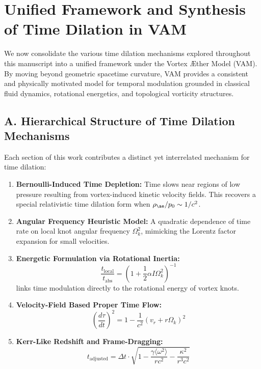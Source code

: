 \section{Unified Framework and Synthesis of Time Dilation in VAM}

We now consolidate the various time dilation mechanisms explored throughout this manuscript into a unified framework under the Vortex Æther Model (VAM). By moving beyond geometric spacetime curvature, VAM provides a consistent and physically motivated model for temporal modulation grounded in classical fluid dynamics, rotational energetics, and topological vorticity structures.

\subsection*{A. Hierarchical Structure of Time Dilation Mechanisms}

Each section of this work contributes a distinct yet interrelated mechanism for time dilation:

\begin{enumerate}
    \item \textbf{Bernoulli-Induced Time Depletion:} Time slows near regions of low pressure resulting from vortex-induced kinetic velocity fields. This recovers a special relativistic time dilation form when \( \rho_{\ae} / p_0 \sim 1/c^2 \).

    \item \textbf{Angular Frequency Heuristic Model:} A quadratic dependence of time rate on local knot angular frequency \( \Omega_k^2 \), mimicking the Lorentz factor expansion for small velocities.

    \item \textbf{Energetic Formulation via Rotational Inertia:}
    \[
        \boxed{\frac{t_{\text{local}}}{t_{\text{abs}}} = \left(1 + \frac{1}{2} \alpha I \Omega_k^2 \right)^{-1}}
    \]
    links time modulation directly to the rotational energy of vortex knots.

    \item \textbf{Velocity-Field Based Proper Time Flow:}
    \[
        \boxed{\left( \frac{d\tau}{dt} \right)^2 = 1 - \frac{1}{c^2}(v_r + r\Omega_k)^2}
    \]

    \item \textbf{Kerr-Like Redshift and Frame-Dragging:}
    \[
        \boxed{t_{\text{adjusted}} = \Delta t \cdot \sqrt{1 - \frac{\gamma \langle \omega^2 \rangle}{rc^2} - \frac{\kappa^2}{r^3c^2}}}
    \]
\end{enumerate}

